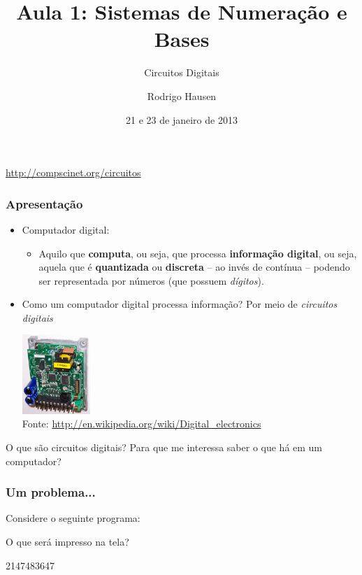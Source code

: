 \documentclass{beamer}
\title{Aula 1: Sistemas de Numeração e Bases}
\subtitle{Circuitos Digitais}
\author{Rodrigo Hausen}
\institute{CMCC -- UFABC}
\date{21 e 23 de janeiro de 2013}
\begin{document}
\begin{frame}
\maketitle

\vspace{-1cm}

\begin{center}
\url{http://compscinet.org/circuitos}
\end{center}

\end{frame}

\begin{frame}
\frametitle{Apresentação}

\begin{itemize}
\item Computador digital:
\pause
\begin{itemize}
\item Aquilo que \textbf{computa}, ou seja, que processa \textbf{informação \pause digital}, ou seja, aquela que é \textbf{quantizada} ou \textbf{discreta} -- ao invés de contínua -- podendo ser representada por números (que possuem \emph{dígitos}).
\end{itemize}
\pause
\item Como um computador digital processa informação? \pause Por meio de \emph{circuitos digitais}
\begin{center}
\includegraphics[height=3cm]{images/HitachiJ100A.jpg}\\[-6pt]
{\color{gray!50!white}\tiny{Fonte: \url{http://en.wikipedia.org/wiki/Digital_electronics}}}
\end{center}
\end{itemize}

\pause

O que são circuitos digitais? \pause Para que me interessa saber o que há em um computador?

\end{frame}


\begin{frame}[fragile] %
\frametitle{Um problema...}

Considere o seguinte programa:

\hfill\begin{minipage}{0.95\textwidth}

\end{minipage}

O que será impresso na tela?

\pause

\begin{semiverbatim}
2147483647
\end{semiverbatim}

\end{frame}
\end{document}
